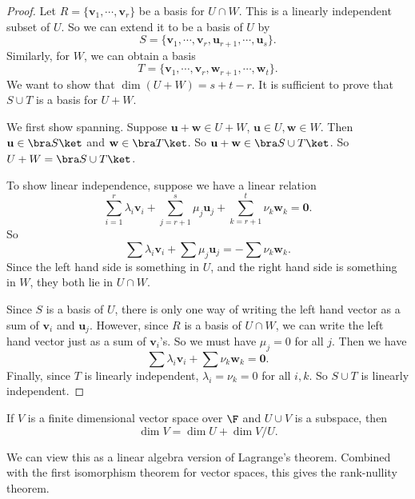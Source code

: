 \documentclass[a4paper]{article}
\begin{document}
\begin{proof}
  Let $R = \{\mathbf{v}_1, \cdots, \mathbf{v}_r\}$ be a basis for $U\cap W$. This is a linearly independent subset of $U$. So we can extend it to be a basis of $U$ by
  \[
    S = \{\mathbf{v}_1, \cdots, \mathbf{v}_r, \mathbf{u}_{r + 1}, \cdots, \mathbf{u}_s\}.
  \]
  Similarly, for $W$, we can obtain a basis
  \[
    T = \{\mathbf{v}_1, \cdots, \mathbf{v}_r, \mathbf{w}_{r + 1}, \cdots, \mathbf{w}_t\}.
  \]
  We want to show that $\dim (U + W) = s + t - r$. It is sufficient to prove that $S\cup T$ is a basis for $U + W$.

  We first show spanning. Suppose $\mathbf{u} + \mathbf{w} \in U + W$, $\mathbf{u}\in U, \mathbf{w}\in W$. Then $\mathbf{u}\in \bra S\ket$ and $\mathbf{w}\in \bra T\ket$. So $\mathbf{u} + \mathbf{w} \in \bra S\cup T\ket$. So $U + W = \bra S \cup T\ket$.

  To show linear independence, suppose we have a linear relation
  \[
    \sum_{i = 1}^r \lambda_i \mathbf{v}_i + \sum_{j = r + 1}^s \mu_j \mathbf{u}_j + \sum_{k = r + 1}^t \nu_k \mathbf{w}_k = \mathbf{0}.
  \]
  So
  \[
    \sum \lambda_i \mathbf{v}_i + \sum \mu_j \mathbf{u}_j = - \sum \nu_k \mathbf{w}_k.
  \]
  Since the left hand side is something in $U$, and the right hand side is something in $W$, they both lie in $U\cap W$.

  Since $S$ is a basis of $U$, there is only one way of writing the left hand vector as a sum of $\mathbf{v}_i$ and $\mathbf{u}_j$. However, since $R$ is a basis of $U\cap W$, we can write the left hand vector just as a sum of $\mathbf{v}_i$'s. So we must have $\mu_j = 0$ for all $j$. Then we have
  \[
    \sum \lambda_i \mathbf{v}_i + \sum \nu_k \mathbf{w}_k = \mathbf{0}.
  \]
  Finally, since $T$ is linearly independent, $\lambda_i = \nu_k = 0$ for all $i, k$. So $S\cup T$ is linearly independent.
\end{proof}

\begin{prop}
  If $V$ is a finite dimensional vector space over $\F$ and $U\cup V$ is a subspace, then
  \[
    \dim V = \dim U + \dim V/U.
  \]
\end{prop}
We can view this as a linear algebra version of Lagrange's theorem. Combined with the first isomorphism theorem for vector spaces, this gives the rank-nullity theorem.
\end{document}
